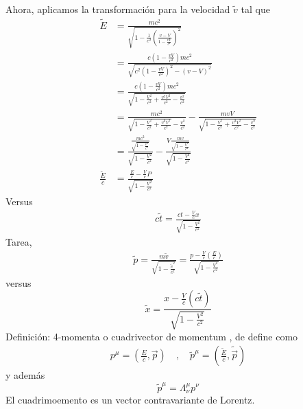 \documentclass[../main.tex]{subfiles}
\begin{document}
Ahora, aplicamos la transformación para la velocidad $\tilde{v}$ tal que
\begin{align*}
  \tilde{E} & = \frac{mc^2}{\sqrt{1-\frac{1}{c^2}\left( \frac{v-V}{1-\frac{vV}{c^2}} \right)^2}}\\
  & = \frac{c\left( 1-\frac{vV}{c^2} \right)mc^2}{\sqrt{c^2\left( 1-\frac{vV}{c^2} \right)^2 - (v-V)^2}} \\
  & = \frac{c(1-\frac{vV}{c^2})mc^2}{\sqrt{1-\frac{V^2}{c^2}+ \frac{v^2V^2}{c^2}-\frac{v^2}{c^2}}} \\
  & = \frac{mc^2}{\sqrt{1-\frac{V^2}{c^2} + \frac{v^2V^2}{c^2}} - \frac{v^2}{c^2}}  - \frac{mvV}{\sqrt{1-\frac{V^2}{c^2} + \frac{v^2V^2}{c^2} - \frac{v^2}{c^2}}}\\
  & = \frac{\frac{mc^2}{\sqrt{1-\frac{v^2}{c^2}}}}{\sqrt{1-\frac{V^2}{c^2}}} - \frac{V\frac{mv}{\sqrt{1-\frac{V^2}{c^2}}}}{\sqrt{1-\frac{V^2}{c^2}}} \\
  \frac{\tilde{E}}{c}& = \frac{\frac{E}{c}-\frac{V}{c}P}{\sqrt{1-\frac{V^2}{c^2}}}
\end{align*}
Versus
\begin{align*}
  c\tilde{t} =\frac{ct-\frac{V}{c}x}{\sqrt{1-\frac{V^2}{c^2}}}
\end{align*}
Tarea, 
\begin{align*}
  \tilde{p}=\frac{m\tilde{v}}{\sqrt{1-\frac{\tilde{v}^2}{c^2}}} = \frac{p-\frac{V}{c}\left( \frac{E}{c} \right)}{\sqrt{1-\frac{V^2}{c^2}}}
\end{align*}
versus
\begin{equation*}
  \tilde{x} = \frac{x-\frac{V}{c}(c\tilde{t})}{\sqrt{1-\frac{V^2}{c^2}}}
\end{equation*}
Definición: 4-momenta o cuadrivector de momentum , de define como 
\begin{align}
  p^\mu = \left( \frac{E}{c},\vec{p} \right)\quad , \quad \tilde{p}^\mu = \left(\frac{\tilde{E}}{c}, \tilde{\vec{p}}\right)
\end{align}
y además
\begin{equation}
  \tilde{p}^\mu = \Lambda^\mu_\nu p^\nu
\end{equation}
El cuadrimoemento es un vector contravariante de Lorentz.
\end{document}
